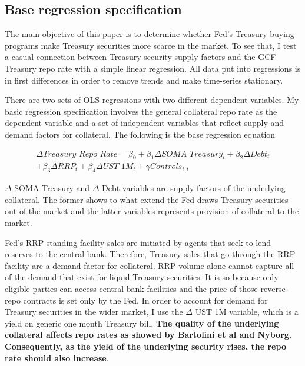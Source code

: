 \documentclass[11pt,a4paper,english,oneside]{article}
\begin{document}
\subsection{Base regression specification} %

The main objective of this paper is to determine whether Fed's Treasury buying programs make Treasury securities more scarce in the market. To see that, I test a casual connection between Treasury security supply factors and the GCF Treasury repo rate with a simple linear regression. All data put into regressions is in first differences in order to remove trends and make time-series stationary.

There are two sets of OLS regressions with two different dependent variables. My basic regression specification involves the general collateral repo rate as the dependent variable and a set of independent variables that reflect supply and demand factors for collateral. The following is the base regression equation

\begin{equation} \label{eq:1}
  \begin{gathered}
  \Delta \textit{Treasury Repo Rate} = \beta_0 + \beta_1 \Delta \textit{SOMA Treasury}_t + \beta_2 \Delta \textit{Debt}_t \\ + \beta_3 \Delta \textit{RRP}_t  + \beta_4 \Delta \textit{UST 1M}_t + \gamma \textit{Controls}_{i,t}
  \end{gathered}
\end{equation}

$\Delta$ SOMA Treasury and $\Delta$ Debt variables are supply factors of the underlying collateral. The former shows to what extend the Fed draws Treasury securities out of the market and the latter variables represents provision of collateral to the market.

Fed's RRP standing facility sales are initiated by agents that seek to lend reserves to the central bank. Therefore, Treasury sales that go through the RRP facility are a demand factor for collateral. RRP volume alone cannot capture all of the demand that exist for liquid Treasury securities. It is so because only eligible parties can access central bank facilities and the price of those reverse-repo contracts is set only by the Fed. In order to account for demand for Treasury securities in the wider market, I use the $\Delta$ UST 1M variable, which is a yield on generic one month Treasury bill. \textbf{The quality of the underlying collateral affects repo rates as showed by Bartolini et al and Nyborg. Consequently, as the yield of the underlying security rises, the repo rate should also increase}.
\end{document}
